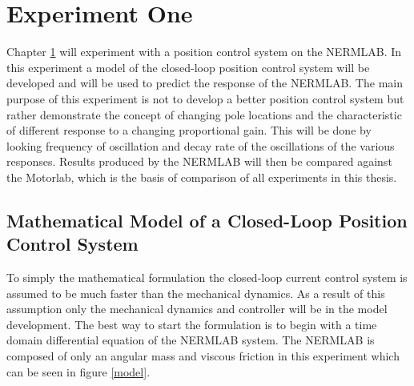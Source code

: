 
\cleardoublepage

\chapter{Experiment One}
\label{chp4}

Chapter \ref{chp4} will experiment with a position control system on the NERMLAB. In this experiment a model of the closed-loop position control system will be developed and will be used to predict the response of the NERMLAB. The main purpose of this experiment is not to develop a better position control system but rather demonstrate the concept of changing pole locations and the characteristic of different response to a changing proportional gain. This will be done by looking frequency of oscillation and decay rate of the oscillations of the various responses. Results produced by the NERMLAB will then be compared against the Motorlab, which is the basis of comparison of all experiments in this thesis. 

\section{Mathematical Model of a Closed-Loop Position Control System}

To simply the mathematical formulation the closed-loop current control system is assumed to be much faster than the mechanical dynamics. As a result of this assumption only the mechanical dynamics and controller will be in the model development.  The best way to start the formulation is to begin with a time domain differential equation of the NERMLAB system. The NERMLAB is composed of only an angular mass and viscous friction in this experiment which can be seen in figure \ref{model}.

